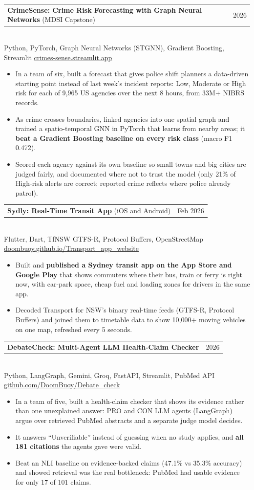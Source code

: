\documentclass[letterpaper,11pt]{article}
\makeatletter
\newcommand{\resumeItem}[1]{\item\small{#1}}
\newcommand{\resumeProjectHeading}[3]{
  \vspace{-1pt}\item
    \begin{tabular*}{0.98\textwidth}[t]{l@{\extracolsep{\fill}}r}
      \small #1 & \small #2 \\
    \end{tabular*}\\[-1pt]
    {\footnotesize #3}\vspace{-6pt}
}
\newcommand{\resumeItemListStart}{\begin{itemize}}
\newcommand{\resumeItemListEnd}{\end{itemize}\vspace{-4pt}}
\newcommand{\plainlink}[1]{\href{https://#1}{#1}}
\makeatother
\begin{document}
\resumeProjectHeading
  {\textbf{CrimeSense: Crime Risk Forecasting with Graph Neural Networks} (MDSI Capstone)}{2026}
  {Python, PyTorch, Graph Neural Networks (STGNN), Gradient Boosting, Streamlit \textbar{} \plainlink{crimes-sense.streamlit.app}}
  \resumeItemListStart
    \resumeItem{In a team of six, built a forecast that gives police shift planners a data-driven starting point instead of last week's incident reports: Low, Moderate or High risk for each of 9,965 US agencies over the next 8 hours, from 33M+ NIBRS records.}
    \resumeItem{As crime crosses boundaries, linked agencies into one spatial graph and trained a spatio-temporal GNN in PyTorch that learns from nearby areas; it \textbf{beat a Gradient Boosting baseline on every risk class} (macro F1 0.472).}
    \resumeItem{Scored each agency against its own baseline so small towns and big cities are judged fairly, and documented where not to trust the model (only 21\% of High-risk alerts are correct; reported crime reflects where police already patrol).}
  \resumeItemListEnd

\resumeProjectHeading
  {\textbf{Sydly: Real-Time Transit App} (iOS and Android)}{Feb 2026}
  {Flutter, Dart, TfNSW GTFS-R, Protocol Buffers, OpenStreetMap \textbar{} \plainlink{doombuoy.github.io/Transport\_app\_website}}
  \resumeItemListStart
    \resumeItem{Built and \textbf{published a Sydney transit app on the App Store and Google Play} that shows commuters where their bus, train or ferry is right now, with car-park space, cheap fuel and loading zones for drivers in the same app.}
    \resumeItem{Decoded Transport for NSW's binary real-time feeds (GTFS-R, Protocol Buffers) and joined them to timetable data to show 10,000+ moving vehicles on one map, refreshed every 5 seconds.}
  \resumeItemListEnd

\resumeProjectHeading
  {\textbf{DebateCheck: Multi-Agent LLM Health-Claim Checker}}{2026}
  {Python, LangGraph, Gemini, Groq, FastAPI, Streamlit, PubMed API \textbar{} \plainlink{github.com/DoomBuoy/Debate\_check}}
  \resumeItemListStart
    \resumeItem{In a team of five, built a health-claim checker that shows its evidence rather than one unexplained answer: PRO and CON LLM agents (LangGraph) argue over retrieved PubMed abstracts and a separate judge model decides.}
    \resumeItem{It answers ``Unverifiable'' instead of guessing when no study applies, and \textbf{all 181 citations} the agents gave were valid.}
    \resumeItem{Beat an NLI baseline on evidence-backed claims (47.1\% vs 35.3\% accuracy) and showed retrieval was the real bottleneck: PubMed had usable evidence for only 17 of 101 claims.}
  \resumeItemListEnd
\end{document}
